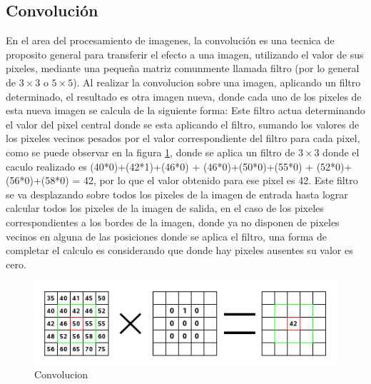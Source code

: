 \documentclass[a4paper,11pt,spanish]{book}
\begin{document}
   \subsection{Convolución} \label{sec:convolucion}
      En el area del procesamiento de imagenes, la convolución es una tecnica de proposito general para transferir el efecto a una imagen, utilizando el valor de sus pixeles,
      mediante una pequeña matriz comunmente llamada filtro (por lo general de $3\times3$ o $5\times5$). 
      Al realizar la convolucion sobre una imagen, aplicando un filtro determinado, el resultado es otra imagen nueva, donde cada uno de los pixeles de esta nueva imagen se calcula de la siguiente forma:
      Este filtro actua determinando el valor del pixel central donde se esta aplicando el filtro, sumando los valores de los pixeles vecinos pesados por el valor correspondiente del filtro para 
      cada pixel, como se puede observar en la figura \ref{fig:convolution}, donde se aplica un filtro de $3\times3$ donde el caculo realizado es (40*0)+(42*1)+(46*0) + (46*0)+(50*0)+(55*0) + (52*0)+(56*0)+(58*0) = 42,
      por lo que el valor obtenido para ese pixel es 42.
      Este filtro se va desplazando sobre todos los pixeles de la imagen de entrada hasta lograr calcular todos los pixeles de la imagen de salida, en el caso de los pixeles correspondientes
      a los bordes de la imagen, donde ya no disponen de pixeles vecinos en alguna de las posiciones donde se aplica el filtro, una forma de completar el calculo es considerando que donde
      hay pixeles ausentes su valor es cero.
      \begin{figure}[h]
	\begin{center}
	\includegraphics[width=0.8\linewidth]{./img/convolution.png}
	\end{center}
	\caption{Convolucion}
	\label{fig:convolution}
      \end{figure}
   
\end{document}
